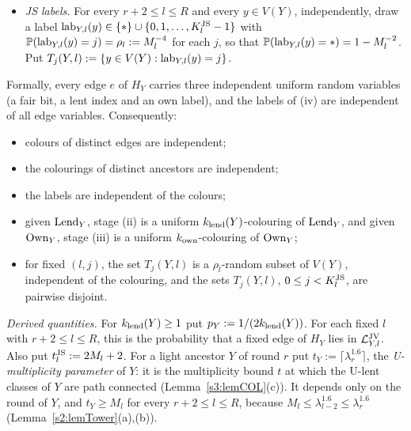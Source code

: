 \begin{definition}
\begin{itemize}
  sections. For standalone $Y$, $\Own_Y$ is not subdivided at stage~1.
\item[(iv)] \emph{JS labels.} For every $r+2\le l\le R$ and every
  $y\in V(Y)$, independently, draw a label
  $\mathrm{lab}_{Y,l}(y)\in\{\ast\}\cup\{0,1,\dots,K^{\mathrm{JS}}_l-1\}$ with
  $\mathbb{P}(\mathrm{lab}_{Y,l}(y)=j)=\rho_l:=M_l^{-4}$ for each $j$, so that
  $\mathbb{P}(\mathrm{lab}_{Y,l}(y)=\ast)=1-M_l^{-2}$. Put
  $T_j(Y,l):=\{y\in V(Y):\mathrm{lab}_{Y,l}(y)=j\}$.
\end{itemize}
Formally, every edge $e$ of $H_Y$ carries three independent uniform
random variables (a fair bit, a lent index and an own label), and the
labels of (iv) are independent of all edge variables. Consequently:
\begin{itemize}
\item colours of distinct edges are independent;
\item the colourings of distinct ancestors are independent;
\item the labels are independent of the colours;
\item given $\mathrm{Lend}_Y$, stage (ii) is a uniform $k_{\mathrm{lend}}(Y)$-colouring of
  $\mathrm{Lend}_Y$, and given $\Own_Y$, stage (iii) is a uniform
  $k_{\mathrm{own}}$-colouring of $\Own_Y$;
\item for fixed $(l,j)$, the set $T_j(Y,l)$ is a $\rho_l$-random subset
  of $V(Y)$, independent of the colouring, and the sets $T_j(Y,l)$,
  $0\le j<K^{\mathrm{JS}}_l$, are pairwise disjoint.
\end{itemize}

\emph{Derived quantities.} For $k_{\mathrm{lend}}(Y)\ge1$ put
$p_Y:=1/(2k_{\mathrm{lend}}(Y))$. For each fixed $l$ with $r+2\le l\le R$, this is
the probability that a fixed edge of $H_Y$ lies in $\mathcal{L}^{\mathrm{JV}}_{Y,l}$. Also put
$t^{\mathrm{JS}}_l:=2M_l+2$. For a light ancestor $Y$ of round $r$ put
$t_Y:=\lceil\lambda_r^{1.6}\rceil$, the \emph{U-multiplicity parameter}
of $Y$: it is the multiplicity bound $t$ at which the U-lent classes of
$Y$ are path connected (Lemma~\ref{s3:lemCOL}(c)). It depends only on
the round of $Y$, and $t_Y\ge M_l$ for every $r+2\le l\le R$, because
$M_l\le\lambda_{l-2}^{1.6}\le\lambda_r^{1.6}$
(Lemma~\ref{s2:lemTower}(a),(b)).


\end{definition}
